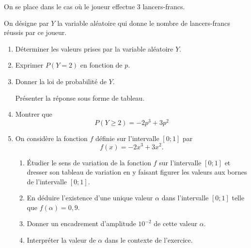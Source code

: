 \documentclass[10pt]{article}
\begin{document}
	On se place dans le cas où le joueur effectue 3 lancers-francs.

	On désigne par $Y$ la variable aléatoire qui donne le nombre de lancers-francs réussis par ce joueur.

	\begin{enumerate}
		\item Déterminer les valeurs prises par la variable aléatoire $Y$.

		\item Exprimer $P(Y=2)$ en fonction de $p$.

		\item Donner la loi de probabilité de $Y$.

		Présenter la réponse sous forme de tableau.

		\item Montrer que
		\[P(Y \geqslant  2)=-2 p^{3}+3 p^{2}\]

		\item On considère la fonction $f$ définie sur l'intervalle $[0 ; 1]$ par
		\[f(x)=-2 x^{3}+3 x^{2}.\]
		\begin{enumerate}
			\item Étudier le sens de variation de la fonction $f$ sur l'intervalle $[0 ; 1]$ et dresser son tableau de variation en y faisant figurer les valeurs aux bornes de l'intervalle $[0 ; 1]$.

			\item En déduire l'existence d'une unique valeur $\alpha$ dans l'intervalle $[0 ; 1]$ telle que $f(\alpha)=0,9$.

			\item Donner un encadrement d'amplitude $10^{-2}$ de cette valeur $\alpha$.

			\item Interpréter la valeur de $\alpha$ dans le contexte de l'exercice.
		\end{enumerate}
	\end{enumerate}
\end{document}
